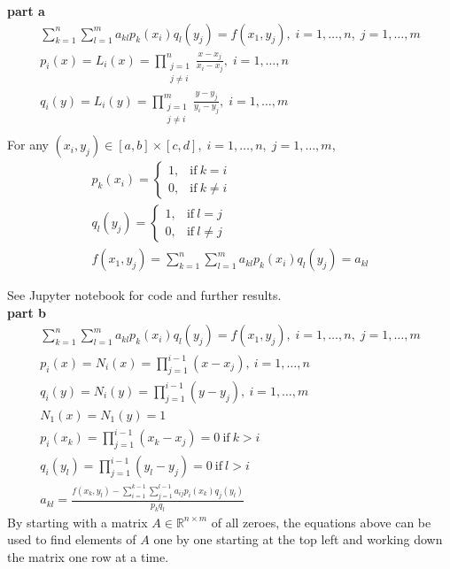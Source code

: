 \documentclass{article} %
\begin{document}
\textbf{part a} \\
\begin{align*}
\sum_{k=1}^n \sum_{l=1}^m a_{kl} p_k (x_i) q_l(y_j) = f(x_1, y_j), \; i = 1, \hdots , n, \; j=1, \hdots,m \\
p_i(x) = L_i(x) = \prod_{\substack{j=1 \\ j\neq i}}^n \frac{x - x_j}{x_i - x_j}, \; i = 1, \hdots , n \\
q_i(y) = L_i(y) = \prod_{\substack{j=1 \\ j\neq i}}^m \frac{y - y_j}{y_i - y_j}, \; i = 1, \hdots , m \\
\end{align*}
For any $(x_i, y_j) \in [a, b] \times [c, d],\; i=1, \hdots, n, \; j=1,\hdots,m$, 
\begin{align*}
p_k(x_i) = \begin{cases} 1,& \text{if}\ k = i \\
	0, & \text{if}\ k\neq i \end{cases} \\
q_l(y_j) = \begin{cases} 1,& \text{if}\ l = j \\
	0, & \text{if}\ l\neq j \end{cases} \\
f(x_1, y_j) = \sum_{k=1}^n \sum_{l=1}^m a_{kl} p_k (x_i) q_l(y_j) = a_{kl}
\end{align*}

See Jupyter notebook for code and further results.
\\

\textbf{part b} \\
\begin{align*}
\sum_{k=1}^n \sum_{l=1}^m a_{kl} p_k (x_i) q_l(y_j) = f(x_1, y_j), \; i = 1, \hdots , n, \; j=1, \hdots,m \\
p_i(x) = N_i(x) = \prod_{j=1}^{i-1} (x - x_j), \  i = 1, \hdots , n \\
q_i(y) = N_i(y) = \prod_{j=1}^{i-1} (y - y_j), \  i = 1, \hdots , m \\ 
N_1(x) = N_1(y) = 1 \\
p_i(x_k) = \prod_{j=1}^{i-1} (x_k - x_j) = 0\ \text{if}\ k > i \\
q_i(y_l) = \prod_{j=1}^{i-1} (y_l - y_j) = 0\ \text{if}\ l > i \\ 
a_{kl} = \frac{f(x_k, y_l) - \sum_{i=1}^{k-1} \sum_{j=1}^{l-1} a_{ij} p_i(x_k) q_j(y_l)}{p_k q_l}
\end{align*}
By starting with a matrix $A \in \mathbb{R}^{n \times m}$ of all zeroes, the equations above can be used to find elements of $A$ one by one starting at the top left and working down the matrix one row at a time.
\\
\end{document}
